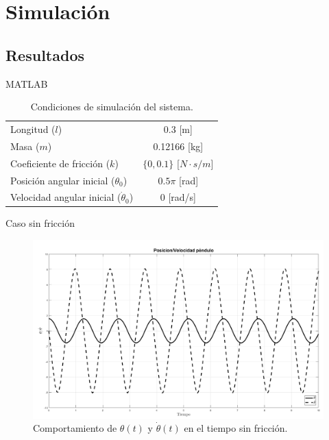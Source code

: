 \documentclass{beamer}
\begin{document}
\section{Simulación}
\subsection{Resultados}
\begin{frame}{MATLAB}
 \begin{table}[hb]
 \begin{center}
\begin{tabular}{lc}
\hline
Longitud ($l$) & 0.3 [m] \\
Masa ($m$) & 0.12166 [kg]\\
Coeficiente de fricción ($k$) & $\{0,0.1\}$ [$N \cdot s / m$] \\
Posición angular inicial ($\theta_0$) & $0.5\pi$ [rad] \\
Velocidad angular inicial ($\dot{\theta}_0$) & 0 [rad/s] \\
\hline
 \end{tabular}
 \end{center}
 \caption{Condiciones de simulación del sistema.}
\label{table: simulation conditions}
\end{table}

\end{frame}


\begin{frame}{Caso sin fricción}
\begin{figure}[hb!]
 \centering 
 \includegraphics[scale=0.2]{../Report/img/PosVelNF.png}
 \caption{Comportamiento de $\theta(t)$ y $\dot{\theta}(t)$ en el tiempo sin fricción.}
 \label{fig: time plot theta dtheta no friction}
\end{figure}

\end{frame}
\end{document}
